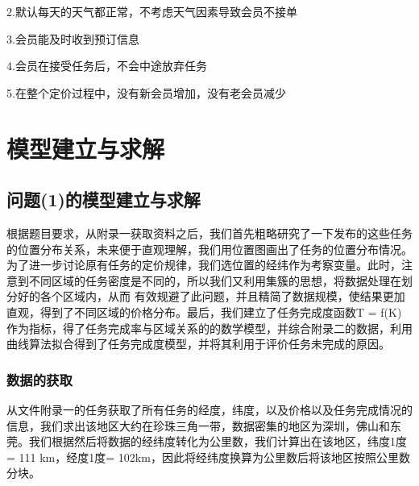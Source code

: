 \documentclass{ctexart}
\begin{document}
2.默认每天的天气都正常，不考虑天气因素导致会员不接单

3.会员能及时收到预订信息

4.会员在接受任务后，不会中途放弃任务

5.在整个定价过程中，没有新会员增加，没有老会员减少



\section{模型建立与求解}
\subsection{问题(1)的模型建立与求解}
根据题目要求，从附录一获取资料之后，我们首先粗略研究了一下发布的这些任务的位置分布关系，未来便于直观理解，我们用位置图画出了任务的位置分布情况。为了进一步讨论原有任务的定价规律，我们选位置的经纬作为考察变量。此时，注意到不同区域的任务密度是不同的，所以我们又利用集簇的思想，将数据处理在划分好的各个区域内，从而 有效规避了此问题，并且精简了数据规模，使结果更加直观，得到了不同区域的价格分布。最后，我们建立了任务完成度函数T = f(K)作为指标，得了任务完成率与区域关系的的数学模型，并综合附录二的数据，利用曲线算法拟合得到了任务完成度模型，并将其利用于评价任务未完成的原因。
\subsubsection{数据的获取}
从文件附录一的任务获取了所有任务的经度，纬度，以及价格以及任务完成情况的信息，我们求出该地区大约在珍珠三角一带，数据密集的地区为深圳，佛山和东莞。我们根据然后将数据的经纬度转化为公里数，我们计算出在该地区，纬度1度= 111 km，经度1度= 102km，因此将经纬度换算为公里数后将该地区按照公里数分块。
\end{document}
